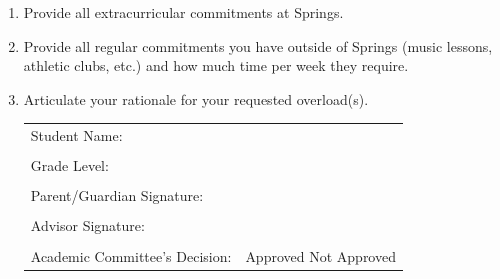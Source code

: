  
 
 
 
 
 
 
\begin{enumerate}
  \item Provide all extracurricular commitments at Springs.
  
  \vfill
  
  \item Provide all regular commitments you have outside of Springs (music lessons, athletic clubs, etc.) and how much time per week they require.
  
  \vfill
  
  \item Articulate your rationale for your requested overload(s).
  
  \vfill
  
  
  
  
  \vfill
  \noindent\hrulefill
  \vspace{.5cm}

  \renewcommand{\arraystretch}{1}
  \noindent\begin{tabular}{ll}
  Student Name: & \underline{\hspace{7cm}}\\
  &\\
  Grade Level:  & \underline{\hspace{7cm}}\\
  &\\
  Parent/Guardian Signature: & \underline{\hspace{7cm}}\\
  &\\
  Advisor Signature:  & \underline{\hspace{7cm}}\\
  &\\
  Academic Committee’s Decision:	& Approved  \hspace{.5cm} 	Not Approved
  \end{tabular}
\end{enumerate} 






































